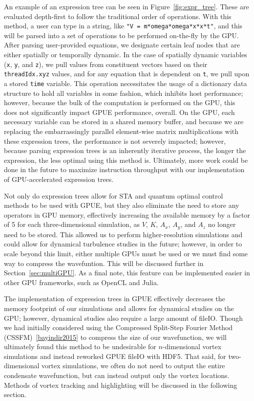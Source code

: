 An example of an expression tree can be seen in Figure~\ref{fig:expr_tree}.
These are evaluated depth-first to follow the traditional order of operations.
With this method, a user can type in a string, like \texttt{"V = m*omega*omega*x*x*t"}, and this will be parsed into a set of operations to be performed on-the-fly by the GPU.
After parsing user-provided equations, we designate certain leaf nodes that are either spatially or temporally dynamic.
In the case of spatially dynamic variables (\texttt{x}, \texttt{y}, and \texttt{z}), we pull values from constituent vectors based on their \texttt{threadIdx.xyz} values, and for any equation that is dependent on \texttt{t}, we pull upon a stored \texttt{time} variable.
This operation necessitates the usage of a dictionary data structure to hold all variables in some fashion, which inhibits host performance; however, because the bulk of the computation is performed on the GPU, this does not significantly impact GPUE performance, overall.
On the GPU, each necessary variable can be stored in a shared memory buffer, and because we are replacing the embarrassingly parallel element-wise matrix multiplications with these expression trees, the performance is not severely impacted; however,
because parsing expression trees is an inherently iterative process, the longer the expression, the less optimal using this method is.
Ultimately, more work could be done in the future to maximize instruction throughput with our implementation of GPU-accelerated expression trees.

Not only do expression trees allow for STA and quantum optimal control methods to be used with GPUE, but they also eliminate the need to store any operators in GPU memory, effectively increasing the available memory by a factor of 5 for each three-dimensional simulation, as $V$, $K$, $A_x$, $A_y$, and $A_z$ no longer need to be stored.
This allowed us to perform higher-resolution simulations and could allow for dynamical turbulence studies in the future; however, in order to scale beyond this limit, either multiple GPUs must be used or we must find some way to compress the wavefuntion.
This will be discussed further in Section~\ref{sec:multiGPU}.
As a final note, this feature can be implemented easier in other GPU frameworks, such as OpenCL and Julia.

The implementation of expression trees in GPUE effectively decreases the memory footprint of our simulations and allows for dynamical studies on the GPU; however, dynamical studies also require a large amount of fileIO.
Though we had initially considered using the Compressed Split-Step Fourier Method (CSSFM)~\ref{bayindir2015} to compress the size of our wavefunction, we will ultimately found this method to be undesirable for $n$-dimensional vortex simulations and instead reworked GPUE fileIO with HDF5.
That said, for two-dimensional vortex simulations, we often do not need to output the entire condensate wavefunction, but can instead output only the vortex locations.
Methods of vortex tracking and highlighting will be discussed in the following section.


